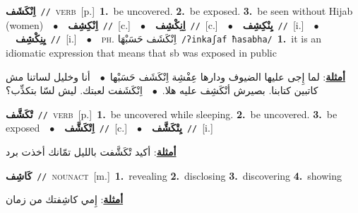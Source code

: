 \documentclass[10pt,a4paper,twoside]{article} %
\begin{document}
\begin{multicols}{2}
{\setlength\topsep{0pt}\textbf{\foreignlanguage{arabic}{اِنْكَشَف}}\ {\color{gray}\texttt{//}\color{black}}\ \textsc{verb}\ [p.]\ \textbf{1.}~be uncovered.  \textbf{2.}~be exposed.  \textbf{3.}~be seen without Hijab (women)\ \ $\bullet$\ \ \setlength\topsep{0pt}\textbf{\foreignlanguage{arabic}{اِنْكِشِف}}\ {\color{gray}\texttt{//}\color{black}}\ [c.]\ \ $\bullet$\ \ \setlength\topsep{0pt}\textbf{\foreignlanguage{arabic}{اِنِكْشِف}}\ {\color{gray}\texttt{//}\color{black}}\ [c.]\ \ $\bullet$\ \ \setlength\topsep{0pt}\textbf{\foreignlanguage{arabic}{يِنْكِشِف}}\ {\color{gray}\texttt{//}\color{black}}\ [i.]\ \ $\bullet$\ \ \setlength\topsep{0pt}\textbf{\foreignlanguage{arabic}{يِنِكْشِف}}\ {\color{gray}\texttt{//}\color{black}}\ [i.]\ \ $\bullet$\ \ \textsc{ph.} \color{gray} \foreignlanguage{arabic}{اِنْكَشَف حَسَبْهَا}\color{black}\ {\color{gray}\texttt{/{\sffamily ʔinkaʃaf ħasabha}/}\color{black}}\ \textbf{1.}~it is an idiomatic expression that means that sb was exposed in public\  \begin{flushright}\color{gray}\foreignlanguage{arabic}{\textbf{\underline{\foreignlanguage{arabic}{أمثلة}}}: لما إِجى عليها الضيوف ودارها عِفْشِة اِنْكَشَف حَسَبْها\ $\bullet$\ \  أنا وخليل لساتنا مش كاتبين كتابنا. بصيرش أنْكَشِف عليه هلا.\ $\bullet$\ \  اِنْكَشَفت لعبتك. ليش لسّا بتكذِّب؟}\end{flushright}\color{black}} \vspace{2mm}

{\setlength\topsep{0pt}\textbf{\foreignlanguage{arabic}{تْكَشَّف}}\ {\color{gray}\texttt{//}\color{black}}\ \textsc{verb}\ [p.]\ \textbf{1.}~be uncovered while sleeping.  \textbf{2.}~be uncovered.  \textbf{3.}~be exposed\ \ $\bullet$\ \ \setlength\topsep{0pt}\textbf{\foreignlanguage{arabic}{اِتْكَشَّف}}\ {\color{gray}\texttt{//}\color{black}}\ [c.]\ \ $\bullet$\ \ \setlength\topsep{0pt}\textbf{\foreignlanguage{arabic}{يِتْكَشَّف}}\ {\color{gray}\texttt{//}\color{black}}\ [i.]\  \begin{flushright}\color{gray}\foreignlanguage{arabic}{\textbf{\underline{\foreignlanguage{arabic}{أمثلة}}}: أكيد تْكَشَّفت بالليل تمّانك أخذت برد}\end{flushright}\color{black}} \vspace{2mm}

{\setlength\topsep{0pt}\textbf{\foreignlanguage{arabic}{كَاشِف}}\ {\color{gray}\texttt{//}\color{black}}\ \textsc{noun\textunderscore act}\ [m.]\ \textbf{1.}~revealing  \textbf{2.}~disclosing  \textbf{3.}~discovering  \textbf{4.}~showing\  \begin{flushright}\color{gray}\foreignlanguage{arabic}{\textbf{\underline{\foreignlanguage{arabic}{أمثلة}}}: إِمي كاشِفتك من زمان}\end{flushright}\color{black}} \vspace{2mm}


\end{multicols}
\end{document}
